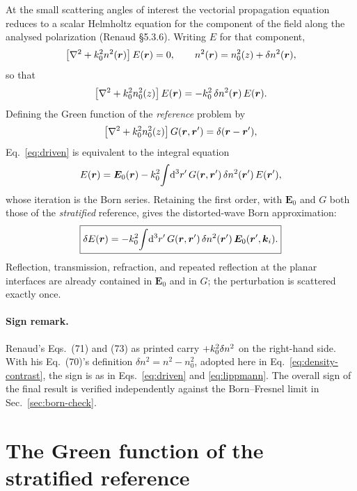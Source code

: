 At the small scattering angles of interest the vectorial propagation equation
reduces to a scalar Helmholtz equation for the component of the field along
the analysed polarization (Renaud \S5.3.6).  Writing $E$ for that component,
\begin{equation}
  \left[\nabla^2+k_0^2n^2(\bm r)\right]E(\bm r)=0,
  \qquad
  n^2(\bm r)=n_0^2(z)+\delta n^2(\bm r),
  \label{eq:helmholtz}
\end{equation}
so that
\begin{equation}
  \left[\nabla^2+k_0^2n_0^2(z)\right]E(\bm r)
  =-k_0^2\,\delta n^2(\bm r)\,E(\bm r).
  \label{eq:driven}
\end{equation}
Defining the Green function of the \emph{reference} problem by
\begin{equation}
  \left[\nabla^2+k_0^2n_0^2(z)\right]G(\bm r,\bm r')=\delta(\bm r-\bm r'),
  \label{eq:green-def}
\end{equation}
Eq.~\eqref{eq:driven} is equivalent to the integral equation
\begin{equation}
  E(\bm r)=\bm E_0(\bm r)
  -k_0^2\!\int\!\mathop{}\!\mathrm{d}^3r'\,G(\bm r,\bm r')\,\delta n^2(\bm r')\,E(\bm r'),
  \label{eq:lippmann}
\end{equation}
whose iteration is the Born series.  Retaining the first order, with $\bm E_0$
and $G$ both those of the \emph{stratified} reference, gives the distorted-wave
Born approximation:
\begin{equation}
  \boxed{
  \delta E(\bm r)
  =-k_0^2\!\int\!\mathop{}\!\mathrm{d}^3r'\,G(\bm r,\bm r')\,\delta n^2(\bm r')\,
   \bm E_0(\bm r',\bm k_i).
  }
  \label{eq:dwba-master}
\end{equation}
Reflection, transmission, refraction, and repeated reflection at the planar
interfaces are already contained in $\bm E_0$ and in $G$; the perturbation is
scattered exactly once.

\paragraph{Sign remark.}  Renaud's Eqs.~(71) and (73) as printed carry
$+k_0^2\delta n^2$ on the right-hand side.  With his Eq.~(70)'s definition
$\delta n^2=n^2-n_0^2$, adopted here in Eq.~\eqref{eq:density-contrast}, the
sign is as in Eqs.~\eqref{eq:driven} and \eqref{eq:lippmann}.  The overall sign
of the final result is verified independently against the Born--Fresnel limit
in Sec.~\ref{sec:born-check}.

\section{The Green function of the stratified reference}
\label{sec:green}

